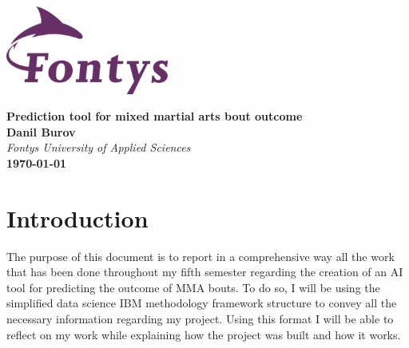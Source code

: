 \documentclass{article}
\begin{document}
	
	\begin{titlepage}
		\centering
		\vspace*{3cm}
		
		\includegraphics[width=0.4\textwidth]{images/fontyslogo.png}
		\vspace{1.5cm}
		
		{\Huge\bfseries Prediction tool for mixed martial arts bout outcome}\\[1cm]
		
		\textbf{Danil Burov}\\
		\vspace{0.5cm}
		\textit{Fontys University of Applied Sciences}\\[3cm]
		\vfill
		\textbf{\today}
		
	\end{titlepage}
	\newpage
	\tableofcontents
	\newpage
	\section{Introduction}
	The purpose of this document is to report in a comprehensive way all the work that has been done throughout my fifth semester regarding the creation of an AI tool for predicting the outcome of MMA bouts. To do so, I will be using the simplified data science IBM methodology framework structure to convey all the necessary information regarding my project. Using this format I will be able to reflect on my work while explaining how the project was built and how it works.\\\\
\end{document}
